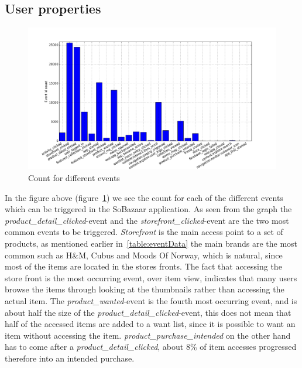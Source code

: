 \subsection{User properties}
    \begin{figure}[H]
        \includegraphics[width=5in]{image/event_iddistribution.png}
        \centering
        \caption{Count for different events}
    \label{figure:eventIDDistribution}
    \end{figure}
        In the figure above (figure~\ref{figure:eventIDDistribution}) we see the count for each of the different events which can be triggered in the SoBazaar application.
        As seen from the graph the \emph{product\_detail\_clicked}-event and the \emph{storefront\_clicked}-event are the two most common events to be triggered.
        \emph{Storefront} is the main access point to a set of products, as mentioned earlier in~\ref{table:eventData} the main brands are the most common such as H\&M, Cubus and Moods Of Norway,
        which is natural, since most of the items are located in the stores fronts.
        The fact that accessing the store front is the most occurring event, over item view, indicates that many users browse the items through looking at the thumbnails rather than accessing the actual item.
        The \emph{product\_wanted}-event is the fourth most occurring event, and is about half the size of the \emph{product\_detail\_clicked}-event, this does not mean that half of the accessed items are added to a want list, since it is possible to want an item without accessing the item.
        \emph{product\_purchase\_intended} on the other hand has to come after a \emph{product\_detail\_clicked}, about 8\% of item accesses progressed therefore into an intended purchase.

